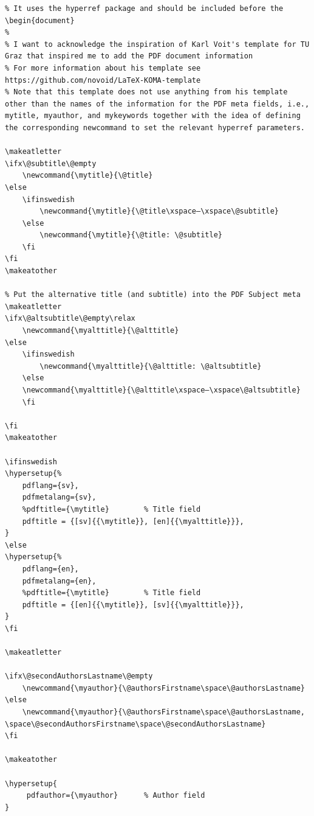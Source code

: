\documentclass[12pt, twoside]{article}
\newif\ifinswedish
\begin{document}
\begin{lstlisting}[language={[LaTeX]TeX}, caption={lib/pdf\_related\_includes.tex
    (edited for readability and to avoid problems when rendering)}, columns=fullflexible, showstringspaces=false, label=lst:informationforPDFfile]
% This file contains the LaTeX to add information to the PDF file (specifically, author(s), title(s), and keywords
% It uses the hyperref package and should be included before the \begin{document}
%
% I want to acknowledge the inspiration of Karl Voit's template for TU Graz that inspired me to add the PDF document information
% For more information about his template see https://github.com/novoid/LaTeX-KOMA-template
% Note that this template does not use anything from his template other than the names of the information for the PDF meta fields, i.e., mytitle, myauthor, and mykeywords together with the idea of defining the corresponding newcommand to set the relevant hyperref parameters.

\makeatletter
\ifx\@subtitle\@empty
    \newcommand{\mytitle}{\@title}
\else
    \ifinswedish
        \newcommand{\mytitle}{\@title\xspace–\xspace\@subtitle}
    \else
        \newcommand{\mytitle}{\@title: \@subtitle}
    \fi
\fi
\makeatother

% Put the alternative title (and subtitle) into the PDF Subject meta
\makeatletter
\ifx\@altsubtitle\@empty\relax
    \newcommand{\myalttitle}{\@alttitle}
\else
    \ifinswedish
        \newcommand{\myalttitle}{\@alttitle: \@altsubtitle}
    \else
    \newcommand{\myalttitle}{\@alttitle\xspace–\xspace\@altsubtitle}
    \fi
    
\fi
\makeatother

\ifinswedish
\hypersetup{%
    pdflang={sv},
    pdfmetalang={sv},
    %pdftitle={\mytitle}        % Title field
    pdftitle = {[sv]{{\mytitle}}, [en]{{\myalttitle}}},
}
\else
\hypersetup{%
    pdflang={en},
    pdfmetalang={en},
    %pdftitle={\mytitle}        % Title field
    pdftitle = {[en]{{\mytitle}}, [sv]{{\myalttitle}}},
}
\fi

\makeatletter

\ifx\@secondAuthorsLastname\@empty
    \newcommand{\myauthor}{\@authorsFirstname\space\@authorsLastname} 
\else
    \newcommand{\myauthor}{\@authorsFirstname\space\@authorsLastname,
\space\@secondAuthorsFirstname\space\@secondAuthorsLastname}
\fi

\makeatother

\hypersetup{
     pdfauthor={\myauthor}      % Author field
}



\end{lstlisting}
\end{document}
